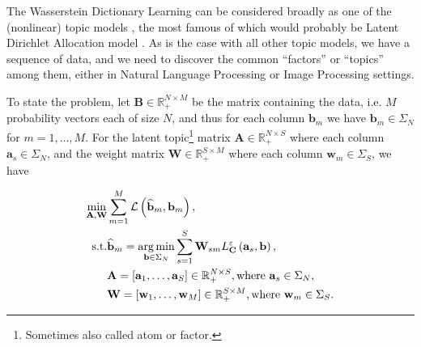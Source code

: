 The Wasserstein Dictionary Learning can be considered broadly as one of the (nonlinear) topic models \citep{blei2009},
the most famous of which would probably be Latent Dirichlet Allocation model \citep[LDA]{blei2003}.
As is the case with all other topic models,
we have a sequence of data, and we need to discover the common ``factors'' or ``topics'' among them,
either in Natural Language Processing \citep{xu2018} or Image Processing \citep{schmitz2018} settings.

To state the problem,
let $\mathbf{B} \in \mathbb{R}_+^{N\times M}$ be the matrix containing the data,
i.e. $M$ probability vectors each of size $N$,
and thus for each column $\mathbf{b}_m$ we have $\mathbf{b}_m \in \Sigma_N$
for $m = 1, \ldots, M$.
For the latent topic\footnote{
  Sometimes also called atom or factor.
} matrix $\mathbf{A} \in \mathbb{R}_+^{N \times S}$ where each column $\mathbf{a}_s \in \Sigma_N$,
and the weight matrix $\mathbf{W} \in \mathbb{R}_+^{S \times M}$ where each column $\mathbf{w}_m \in \Sigma_S$,
we have

\begin{equation}\label{eqn:wasserstein-dictionary-problem-constrained}
  \begin{aligned}
    \min_{\mathbf{A}, \mathbf{W}}
     &
    \sum_{m = 1}^M \mathcal{L} \left(\widehat{\mathbf{b}}_m, \mathbf{b}_m\right),                    \\
    \text{s.t.}
     & \widehat{\mathbf{b}}_m =
    \operatorname*{arg\,min}_{\mathbf{b} \in \Sigma_N}
    \sum_{s = 1}^S \mathbf{W}_{sm} L_{\mathbf{C}}^\varepsilon \left(\mathbf{a}_s, \mathbf{b}\right), \\
     & \mathbf{A} = \left[\mathbf{a}_1, \ldots, \mathbf{a}_S\right] \in \mathbb{R}_+^{N \times S},
    \text{where } \mathbf{a}_s \in \Sigma_N,                                                         \\
     & \mathbf{W} = \left[\mathbf{w}_1, \ldots, \mathbf{w}_M\right] \in \mathbb{R}_+^{S \times M},
    \text{where } \mathbf{w}_m \in \Sigma_S.
  \end{aligned}
\end{equation}






